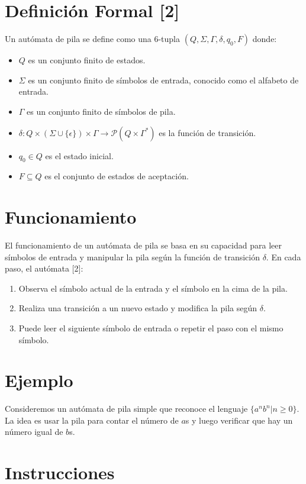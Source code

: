 \documentclass[11pt]{article} %
\begin{document}
	\section{Definición Formal [2]}
	Un autómata de pila se define como una 6-tupla $(Q, \Sigma, \Gamma, \delta, q_0, F)$ donde:
	\begin{itemize}
		\item $Q$ es un conjunto finito de estados.
		\item $\Sigma$ es un conjunto finito de símbolos de entrada, conocido como el alfabeto de entrada.
		\item $\Gamma$ es un conjunto finito de símbolos de pila.
		\item $\delta: Q \times (\Sigma \cup \{\epsilon\}) \times \Gamma \rightarrow \mathcal{P}(Q \times \Gamma^*)$ es la función de transición.
		\item $q_0 \in Q$ es el estado inicial.
		\item $F \subseteq Q$ es el conjunto de estados de aceptación.
	\end{itemize}
	
	\section{Funcionamiento}
	El funcionamiento de un autómata de pila se basa en su capacidad para leer símbolos de entrada y manipular la pila según la función de transición $\delta$. En cada paso, el autómata [2]:
	\begin{enumerate}
		\item Observa el símbolo actual de la entrada y el símbolo en la cima de la pila.
		\item Realiza una transición a un nuevo estado y modifica la pila según $\delta$.
		\item Puede leer el siguiente símbolo de entrada o repetir el paso con el mismo símbolo.
	\end{enumerate}
	
	\section{Ejemplo}
	Consideremos un autómata de pila simple que reconoce el lenguaje $\{ a^n b^n | n \geq 0 \}$. La idea es usar la pila para contar el número de $a$s y luego verificar que hay un número igual de $b$s.
	
	\section{Instrucciones}
	
\end{document}
